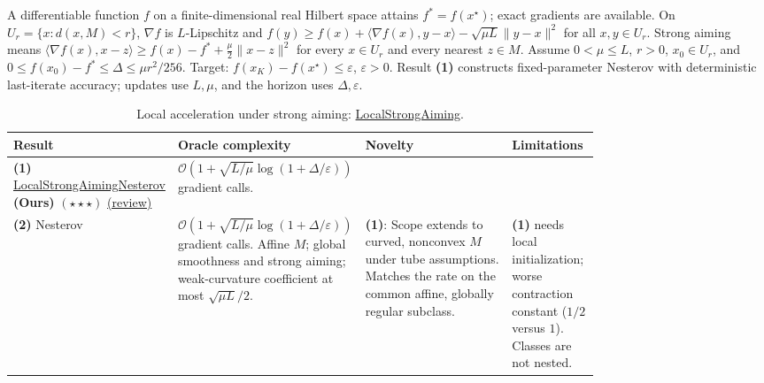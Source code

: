\begin{table}[tp]
\centering
\caption{Local acceleration under strong aiming: \href{https://github.com/k3nfalt/longtails/blob/main/LongTails/Setups/LocalStrongAiming.lean}{LocalStrongAiming}.}\label{tab:LocalStrongAiming}
\parbox{\linewidth}{\footnotesize A differentiable function $f$ on a finite-dimensional real Hilbert space attains $f^*=f(x^\star)$; exact gradients are available. On $U_r=\{x:d(x,M)<r\}$, $\nabla f$ is $L$-Lipschitz and $f(y)\ge f(x)+\langle\nabla f(x),y-x\rangle-\sqrt{\mu L}\|y-x\|^2$ for all $x,y\in U_r$. Strong aiming means $\langle\nabla f(x),x-z\rangle\ge f(x)-f^*+\frac{\mu}{2}\|x-z\|^2$ for every $x\in U_r$ and every nearest $z\in M$. Assume $0<\mu\le L$, $r>0$, $x_0\in U_r$, and $0\le f(x_0)-f^*\le\Delta\le\mu r^2/256$. Target: $f(x_K)-f(x^\star)\le\varepsilon$, $\varepsilon>0$. Result \textbf{(1)} constructs fixed-parameter Nesterov with deterministic last-iterate accuracy; updates use $L,\mu$, and the horizon uses $\Delta,\varepsilon$.}\par\smallskip
\begin{threeparttable}
\footnotesize
\setlength{\tabcolsep}{4pt}\renewcommand{\arraystretch}{1.25}
\begin{tabularx}{\linewidth}{@{}>{\raggedright\arraybackslash}p{0.20\linewidth}>{\raggedright\arraybackslash}p{0.32\linewidth}>{\raggedright\arraybackslash}p{0.25\linewidth}>{\raggedright\arraybackslash}X@{}}
\toprule
\textbf{Result} & \textbf{Oracle complexity} & \textbf{Novelty} & \textbf{Limitations} \\
\midrule
\textbf{(1)} \href{https://github.com/k3nfalt/longtails/blob/main/LongTails/Theorems/LocalStrongAimingNesterov.lean}{Local\allowbreak Strong\allowbreak Aiming\allowbreak Nesterov} \textbf{(Ours)} $(\star\star\star)$ \href{https://github.com/k3nfalt/longtails/blob/main/scripts/reviews/LocalStrongAimingNesterov.md}{(review)} & $\mathcal{O}\!\left(1+\sqrt{L/\mu}\log(1+\Delta/\varepsilon)\right)$ gradient calls. & & \\
\midrule[1.2pt]
\textbf{(2)} Nesterov \citep[Thm.~11]{lsaGupta2025v3} & $\mathcal{O}\!\left(1+\sqrt{L/\mu}\log(1+\Delta/\varepsilon)\right)$ gradient calls. Affine $M$; global smoothness and strong aiming; weak-curvature coefficient at most $\sqrt{\mu L}/2$. & \textbf{(1)}: Scope extends to curved, nonconvex $M$ under tube assumptions. Matches the rate on the common affine, globally regular subclass. & \textbf{(1)} needs local initialization; worse contraction constant ($1/2$ versus $1$). Classes are not nested. \\

\end{tabularx}
\end{threeparttable}
\end{table}
